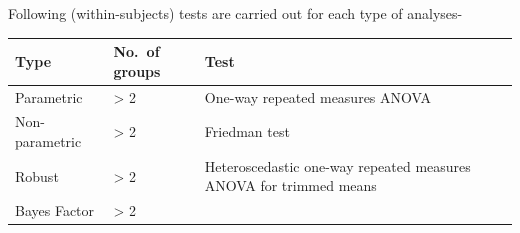 \documentclass[]{article}
\begin{document}
Following (within-subjects) tests are carried out for each type of
analyses-

\begin{longtable}[]{@{}lll@{}}
\toprule
\begin{minipage}[b]{0.26\columnwidth}\raggedright
Type\strut
\end{minipage} & \begin{minipage}[b]{0.07\columnwidth}\raggedright
No.~of groups\strut
\end{minipage} & \begin{minipage}[b]{0.59\columnwidth}\raggedright
Test\strut
\end{minipage}\tabularnewline
\midrule
\endhead
\begin{minipage}[t]{0.26\columnwidth}\raggedright
Parametric\strut
\end{minipage} & \begin{minipage}[t]{0.07\columnwidth}\raggedright
\textgreater{} 2\strut
\end{minipage} & \begin{minipage}[t]{0.59\columnwidth}\raggedright
One-way repeated measures ANOVA\strut
\end{minipage}\tabularnewline
\begin{minipage}[t]{0.26\columnwidth}\raggedright
Non-parametric\strut
\end{minipage} & \begin{minipage}[t]{0.07\columnwidth}\raggedright
\textgreater{} 2\strut
\end{minipage} & \begin{minipage}[t]{0.59\columnwidth}\raggedright
Friedman test\strut
\end{minipage}\tabularnewline
\begin{minipage}[t]{0.26\columnwidth}\raggedright
Robust\strut
\end{minipage} & \begin{minipage}[t]{0.07\columnwidth}\raggedright
\textgreater{} 2\strut
\end{minipage} & \begin{minipage}[t]{0.59\columnwidth}\raggedright
Heteroscedastic one-way repeated measures ANOVA for trimmed means\strut
\end{minipage}\tabularnewline
\begin{minipage}[t]{0.26\columnwidth}\raggedright
Bayes Factor\strut
\end{minipage} & \begin{minipage}[t]{0.07\columnwidth}\raggedright
\textgreater{} 2\strut

\end{minipage}
\end{longtable}
\end{document}
